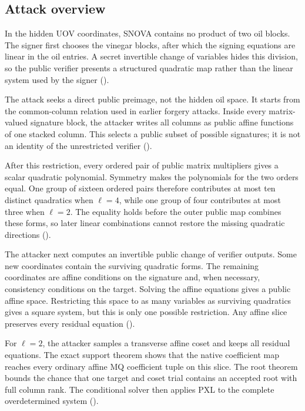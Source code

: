 \documentclass[11pt]{article}
\newcommand{\SNOVA}{\textsf{SNOVA}}
\begin{document}
\subsection{Attack overview}

In the hidden UOV coordinates, \SNOVA{} contains no product of two oil
blocks.  The signer first chooses the vinegar blocks, after which the signing
equations are linear in the oil entries.  A secret invertible change of
variables hides this division, so the public verifier presents a structured
quadratic map rather than the linear system used by the signer
().

The attack seeks a direct public preimage, not the hidden oil space.  It starts
from the common-column relation used in earlier forgery attacks.  Inside every
matrix-valued signature block, the attacker writes all columns as public
affine functions of one stacked column.  This selects a public subset of
possible signatures; it is not an identity of the unrestricted verifier
().

After this restriction, every ordered pair of public matrix multipliers gives
a scalar quadratic polynomial.  Symmetry makes the polynomials for the two
orders equal.  One group of sixteen ordered pairs therefore contributes at
most ten distinct quadratics when $\ell=4$, while one group of four
contributes at most three when $\ell=2$.  The equality holds before the outer
public map combines these forms, so later linear combinations cannot restore
the missing quadratic directions ().

The attacker next computes an invertible public change of verifier outputs.
Some new coordinates contain the surviving quadratic forms.  The remaining
coordinates are affine conditions on the signature and, when necessary,
consistency conditions on the target.  Solving the affine equations gives a
public affine space.  Restricting this space to as many variables as surviving
quadratics gives a square system, but this is only one possible restriction.
Any affine slice preserves every residual equation
().

For $\ell=2$, the attacker samples a transverse affine coset and keeps all
residual equations.  The exact support theorem shows that the native
coefficient map reaches every ordinary affine MQ coefficient tuple on this
slice.  The root theorem bounds the chance that one target and coset trial
contains an accepted root with full column rank.  The conditional solver then
applies PXL to the complete overdetermined system
().
\end{document}
